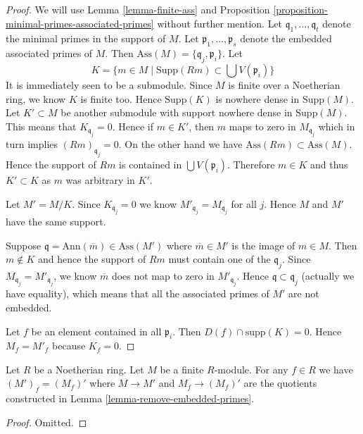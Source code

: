 \begin{proof}
We will use Lemma \ref{lemma-finite-ass} and
Proposition \ref{proposition-minimal-primes-associated-primes}
without further mention.
Let $\mathfrak q_1, \ldots, \mathfrak q_t$ denote the
minimal primes in the support of $M$. Let
$\mathfrak p_1, \ldots, \mathfrak p_s$ denote the
embedded associated primes of $M$. Then
$\text{Ass}(M) = \{\mathfrak q_j, \mathfrak p_i\}$.
Let
$$
K = \{m \in M \mid \text{Supp}(Rm) \subset \bigcup V(\mathfrak p_i)\}
$$
It is immediately seen to be a submodule. Since $M$ is finite over a
Noetherian ring, we know $K$ is finite too. Hence $\text{Supp}(K)$
is nowhere dense in $\text{Supp}(M)$. Let $K' \subset M$ be another submodule
with support nowhere dense in $\text{Supp}(M)$. This means
that $K_{\mathfrak q_j} = 0$. Hence if $m \in K'$,
then $m$ maps to zero in $M_{\mathfrak q_j}$ which
in turn implies $(Rm)_{\mathfrak q_j} = 0$.
On the other hand we have $\text{Ass}(Rm) \subset \text{Ass}(M)$.
Hence the support of $Rm$ is contained in $\bigcup V(\mathfrak p_i)$.
Therefore $m \in K$ and thus $K' \subset K$ as $m$ was arbitrary in $K'$.

\medskip\noindent
Let $M' = M/K$. Since $K_{\mathfrak q_j}=0$ we know
$M'_{\mathfrak q_j} = M_{\mathfrak q_j}$ for all $j$.
Hence $M$ and $M'$ have the same support. 

\medskip\noindent
Suppose $\mathfrak q = \text{Ann}(\overline{m}) \in \text{Ass}(M')$
where $\overline{m} \in M'$ is the image of $m \in M$.
Then $m \not \in K$ and hence the support of $Rm$ must contain one of the
$\mathfrak q_j$. Since $M_{\mathfrak q_j} = M'_{\mathfrak q_j}$,
we know $\overline{m}$ does not map to zero in $M'_{\mathfrak q_j}$.
Hence $\mathfrak q \subset \mathfrak q_j$ (actually we have equality),
which means that all the associated primes of $M'$ are not embedded.

\medskip\noindent
Let $f$ be an element contained in all $\mathfrak p_i$.
Then $D(f) \cap \text{supp}(K) = 0$. Hence $M_f = M'_f$
because $K_f = 0$.
\end{proof}

\begin{lemma}
\label{lemma-remove-embedded-primes-localize}
Let $R$ be a Noetherian ring.
Let $M$ be a finite $R$-module.
For any $f \in R$ we have $(M')_f = (M_f)'$ where
$M \to M'$ and $M_f \to (M_f)'$ are the quotients
constructed in Lemma \ref{lemma-remove-embedded-primes}.
\end{lemma}

\begin{proof}
Omitted.
\end{proof}

